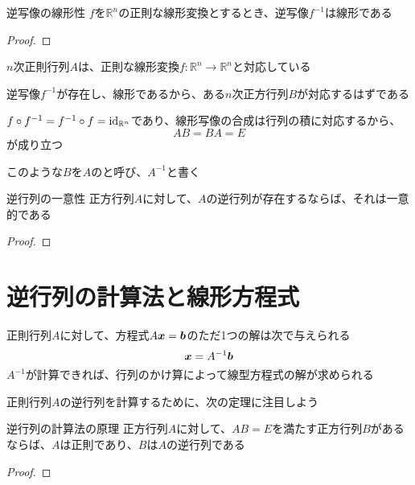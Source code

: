 \documentclass[../../../topic_linear-algebra]{subfiles}
\begin{document}
\begin{theorem}{逆写像の線形性}
  $f$を$\mathbb{R}^n$の正則な線形変換とするとき、逆写像$f^{-1}$は線形である
\end{theorem}

\begin{proof}
\end{proof}

$n$次正則行列$A$は、正則な線形変換$f\colon \mathbb{R}^n \to \mathbb{R}^n$と対応している

逆写像$f^{-1}$が存在し、線形であるから、ある$n$次正方行列$B$が対応するはずである

\br

$f \circ f^{-1} = f^{-1} \circ f = \operatorname{id}_{\mathbb{R}^n}$であり、線形写像の合成は行列の積に対応するから、
\begin{equation*}
  AB = BA = E
\end{equation*}
が成り立つ

\br

このような$B$を$A$のと呼び、$A^{-1}$と書く

\sectionline

\begin{theorem}{逆行列の一意性}
  正方行列$A$に対して、$A$の逆行列が存在するならば、それは一意的である
\end{theorem}

\begin{proof}
\end{proof}

\sectionline
\section{逆行列の計算法と線形方程式}

正則行列$A$に対して、方程式$A\vb*{x} = \vb*{b}$のただ1つの解は次で与えられる
\begin{equation*}
  \vb*{x} = A^{-1} \vb*{b}
\end{equation*}
$A^{-1}$が計算できれば、行列のかけ算によって線型方程式の解が求められる

\sectionline

正則行列$A$の逆行列を計算するために、次の定理に注目しよう

\begin{theorem}{逆行列の計算法の原理}
  正方行列$A$に対して、$AB=E$を満たす正方行列$B$があるならば、$A$は正則であり、$B$は$A$の逆行列である
\end{theorem}

\begin{proof}
\end{proof}
\end{document}
